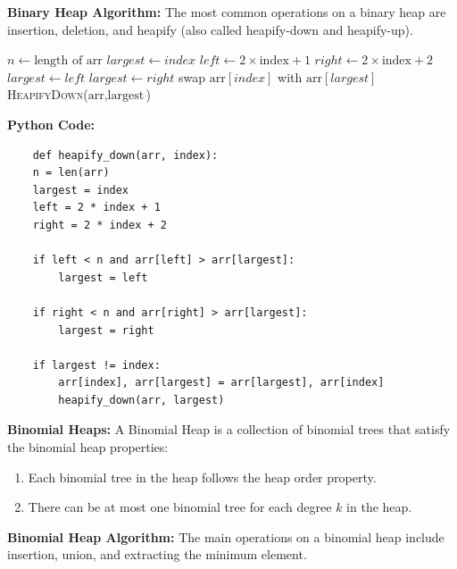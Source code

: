 \documentclass[12pt]{book} %
\begin{document}
\textbf{Binary Heap Algorithm:}
The most common operations on a binary heap are insertion, deletion, and heapify (also called heapify-down and heapify-up).
\FloatBarrier
\begin{algorithm}[H]
\caption{Binary Heap Algorithm}
\begin{algorithmic}[1]
\State $n \gets \text{length of arr}$
\State $largest \gets index$
\State $left \gets 2 \times \text{index} + 1$
\State $right \gets 2 \times \text{index} + 2$
    \State $largest \gets left$
\EndIf
{}
    \State $largest \gets right$
\EndIf
{}
    \State swap $\text{arr}[index]$ with $\text{arr}[largest]$
    \State \textsc{HeapifyDown}($\text{arr}, \text{largest}$)
\EndIf
\EndFunction
\end{algorithmic}
\end{algorithm}
\FloatBarrier
\textbf{Python Code:}
\FloatBarrier
\begin{lstlisting}
    def heapify_down(arr, index):
    n = len(arr)
    largest = index
    left = 2 * index + 1
    right = 2 * index + 2
    
    if left < n and arr[left] > arr[largest]:
        largest = left
        
    if right < n and arr[right] > arr[largest]:
        largest = right
        
    if largest != index:
        arr[index], arr[largest] = arr[largest], arr[index]
        heapify_down(arr, largest)
\end{lstlisting}
\FloatBarrier
\textbf{Binomial Heaps:}
A Binomial Heap is a collection of binomial trees that satisfy the binomial heap properties:
\begin{enumerate}
    \item Each binomial tree in the heap follows the heap order property.
    \item There can be at most one binomial tree for each degree \( k \) in the heap.
\end{enumerate}

\textbf{Binomial Heap Algorithm:}
The main operations on a binomial heap include insertion, union, and extracting the minimum element.
\end{document}
